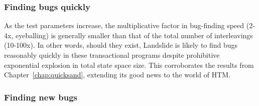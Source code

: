 \subsubsection{Finding bugs quickly}

As the test parameters increase,
the multiplicative factor in bug-finding speed (2-4x, eyeballing) is generally smaller
than that of the total number of interleavings (10-100x).
In other words,
should they exist,
Landslide is likely to find bugs reasonably quickly in these transactional programs
despite prohibitive exponential explosion in total state space size.
This corroborates the results from Chapter~\ref{chap:quicksand},
extending its good news to the world of HTM.

\subsubsection{Finding new bugs}

